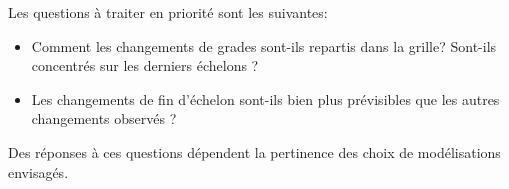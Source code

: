 \documentclass[11pt,a4paper]{article}
\begin{document}
Les questions à traiter en priorité sont les suivantes: 
\begin{itemize}
    \item Comment les changements de grades sont-ils repartis dans la grille? Sont-ils concentrés sur les derniers échelons ?
    \item Les changements de fin d'échelon sont-ils bien plus prévisibles que les autres changements observés ?     
\end{itemize}

Des réponses à ces questions dépendent la pertinence des choix de modélisations envisagés.


\ifx\isEmbedded\undefined
\newpage
 

\end{document}
